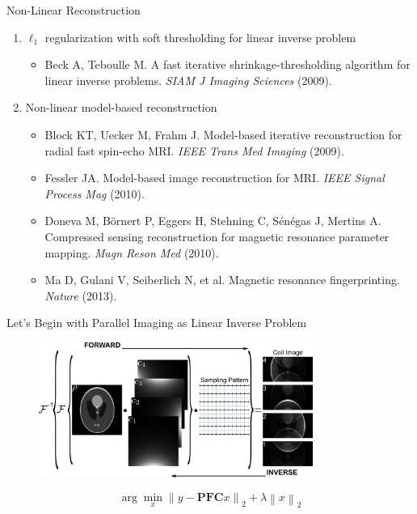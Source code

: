 \documentclass[aspectratio=169]{beamer}
\newcommand*{\norm}[1]{\left\lVert#1\right\rVert}
\newcommand{\argmin}{\arg\!\min}
\begin{document}
	\begin{frame}{Non-Linear Reconstruction}
		\begin{enumerate}
			\item $\ell_1$ regularization with soft thresholding for linear inverse problem 
				\begin{itemize}
					\item Beck A, Teboulle M. A fast iterative shrinkage-thresholding algorithm for linear inverse problems. \textit{SIAM J Imaging Sciences} (2009).
				\end{itemize}
			
			\vspace{1em}
			\item Non-linear model-based reconstruction 
				\begin{itemize}
					\item Block KT, Uecker M, Frahm J. Model-based iterative reconstruction for radial fast spin-echo MRI. \textit{IEEE Trans Med Imaging} (2009).
					\item Fessler JA. Model-based image reconstruction for MRI. \textit{IEEE Signal Process Mag} (2010).
					\item Doneva M, B\"ornert P, Eggers H, Stehning C, S\'en\'egas J, Mertins A. Compressed sensing reconstruction for magnetic resonance parameter mapping. \textit{Magn Reson Med} (2010).
					\item Ma D, Gulani V, Seiberlich N, et al. Magnetic resonance fingerprinting. \textit{Nature} (2013).
				\end{itemize}
		\end{enumerate}
	\end{frame}
	
	\begin{frame}{Let's Begin with Parallel Imaging as Linear Inverse Problem}
		\begin{figure}
			\centering
			\includegraphics[width=0.8\textwidth]{figures/mri-pi.png}
		\end{figure}
		
		\begin{equation}
			\argmin_x \norm{y - \mathbf{P} \mathbf{F} \mathbf{C} x}_2 + \lambda \norm{x}_2
		\end{equation}
	\end{frame}
	
\end{document}
